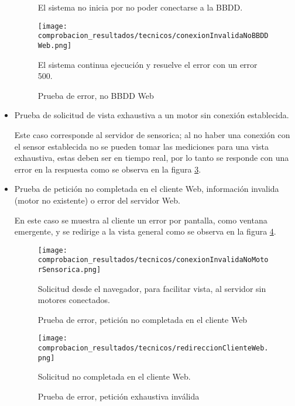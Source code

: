 \begin{itemize}
\begin{figure}[H]
            El sistema no inicia por no poder conectarse a la BBDD.
            \label{img:NoBBDDSensorica}
        \end{figure}

        \begin{figure}[H]
            \centering
            \caption{Prueba de error, no BBDD Web}
            \texttt{[image: comprobacion\_resultados/tecnicos/conexionInvalidaNoBBDDWeb.png]}

            El sistema continua ejecución y resuelve el error con un error 500.
            \label{img:NoBBDDWeb}
        \end{figure}
    \item Prueba de solicitud de vista exhaustiva a un motor sin conexión
        establecida.

        Este caso corresponde al servidor de sensorica; al no haber una conexión
        con el sensor establecida no se pueden tomar las mediciones para una vista
        exhaustiva, estas deben ser en tiempo real, por lo tanto se responde
        con una error en la respuesta como se observa en la figura \ref{img:ErrorExhaustiva}.

    \item Prueba de petición no completada en el cliente Web,
        información invalida (motor no existente) o error del servidor Web.

        En este caso se muestra al cliente un error por pantalla, como ventana
        emergente, y se redirige a la vista general como se observa en la
        figura \ref{img:SolicitudNoCompletada}.

        \begin{figure}[H]
            \centering
            \caption{Prueba de error, petición no completada en el cliente Web}
            \texttt{[image: comprobacion\_resultados/tecnicos/conexionInvalidaNoMotorSensorica.png]}

            Solicitud  desde el navegador, para facilitar vista, al servidor
            sin motores conectados.
            \label{img:ErrorExhaustiva}
        \end{figure}

        \begin{figure}[H]
            \centering
            \caption{Prueba de error, petición exhaustiva inválida}
            \texttt{[image: comprobacion\_resultados/tecnicos/redireccionClienteWeb.png]}

            Solicitud no completada en el cliente Web. \label{img:SolicitudNoCompletada}
        \end{figure}
\end{itemize}

